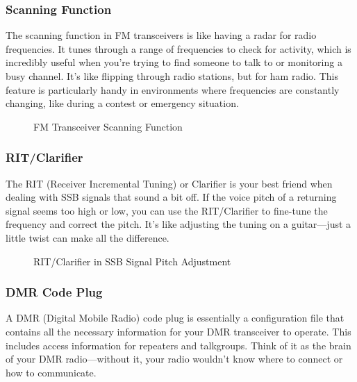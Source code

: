 \subsubsection*{Scanning Function}

The scanning function in FM transceivers is like having a radar for radio frequencies. It tunes through a range of frequencies to check for activity, which is incredibly useful when you’re trying to find someone to talk to or monitoring a busy channel. It’s like flipping through radio stations, but for ham radio. This feature is particularly handy in environments where frequencies are constantly changing, like during a contest or emergency situation.

\begin{figure}[h]
    \centering
    \caption{FM Transceiver Scanning Function}
    \label{fig:scanning-function}
\end{figure}

\subsubsection*{RIT/Clarifier}

The RIT (Receiver Incremental Tuning) or Clarifier is your best friend when dealing with SSB signals that sound a bit off. If the voice pitch of a returning signal seems too high or low, you can use the RIT/Clarifier to fine-tune the frequency and correct the pitch. It’s like adjusting the tuning on a guitar—just a little twist can make all the difference.

\begin{figure}[h]
    \centering
    \caption{RIT/Clarifier in SSB Signal Pitch Adjustment}
    \label{fig:rit-clarifier}
\end{figure}

\subsubsection*{DMR Code Plug}

A DMR (Digital Mobile Radio) code plug is essentially a configuration file that contains all the necessary information for your DMR transceiver to operate. This includes access information for repeaters and talkgroups. Think of it as the brain of your DMR radio—without it, your radio wouldn’t know where to connect or how to communicate.

